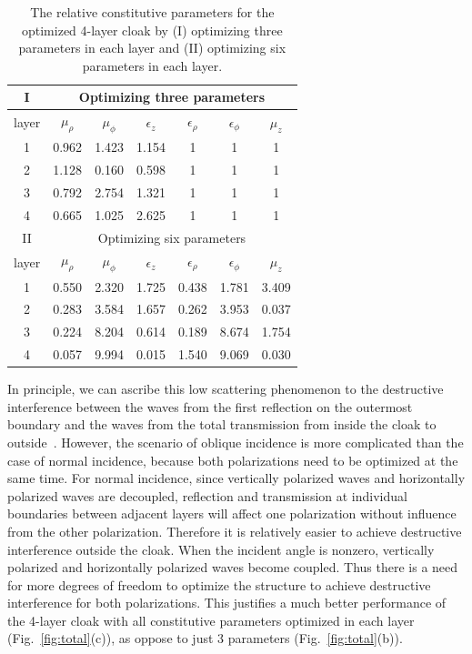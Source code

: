 \documentclass[12pt]{article} %
\begin{document}
\begin{table}
\begin{center}
\begin{tabular}{|c|ccc|ccc|}
\hline
 I&\multicolumn{6}{c|}{Optimizing three parameters} \\
\hline
 layer & $\mu_{\rho}$ & $\mu_{\phi}$ & $\epsilon_{z}$  & $\epsilon_{\rho}$ & $\epsilon_{\phi}$ & $\mu_{z}$ \\
\hline
1 & 0.962 & 1.423 & 1.154 & 1 & 1 & 1\\
 2 & 1.128 &0.160  &  0.598 & 1 & 1 & 1\\
 3 & 0.792 & 2.754 & 1.321 &1 &  1 & 1\\
 4 & 0.665 & 1.025 & 2.625 &1 &  1 & 1 \\
 \hline
  II&\multicolumn{6}{c|}{Optimizing six parameters} \\
\hline
 layer & $\mu_{\rho}$ & $\mu_{\phi}$ & $\epsilon_{z}$  & $\epsilon_{\rho}$ & $\epsilon_{\phi}$ & $\mu_{z}$ \\
\hline
1 & 0.550 & 2.320 & 1.725 & 0.438 & 1.781 & 3.409\\
 2 & 0.283 & 3.584 & 1.657 &  0.262 & 3.953 & 0.037\\
 3 & 0.224 & 8.204 & 0.614& 0.189 & 8.674 & 1.754\\
 4 & 0.057 & 9.994 & 0.015 & 1.540 & 9.069 & 0.030 \\
\hline
\end{tabular}
\caption{\label{table:obliqueparameters} The relative constitutive
parameters for the optimized 4-layer cloak by (I) optimizing three
parameters in each layer and (II) optimizing six parameters in each
layer.}
\end{center}
\end{table}


In principle, we can ascribe this low scattering phenomenon to the
destructive interference between the waves from the first reflection
on the outermost boundary and the waves from the total transmission
from inside the cloak to outside~\cite{xi_optimization}. However,
the scenario of oblique incidence is more complicated than the case
of normal incidence, because both polarizations need to be optimized
at the same time. For normal incidence, since vertically polarized
waves and horizontally polarized waves are decoupled, reflection and
transmission at individual boundaries between adjacent layers will
affect one polarization without influence from the other
polarization. Therefore it is relatively easier to achieve
destructive interference outside the cloak.  When the incident angle
is nonzero, vertically polarized and horizontally polarized waves
become coupled. Thus there is a need for more degrees of freedom to
optimize the structure to achieve destructive interference for both
polarizations. This justifies a much better performance of the
4-layer cloak with all constitutive parameters optimized in each
layer (Fig.~\ref{fig:total}(c)), as oppose to just 3 parameters
(Fig.~\ref{fig:total}(b)).
\end{document}

